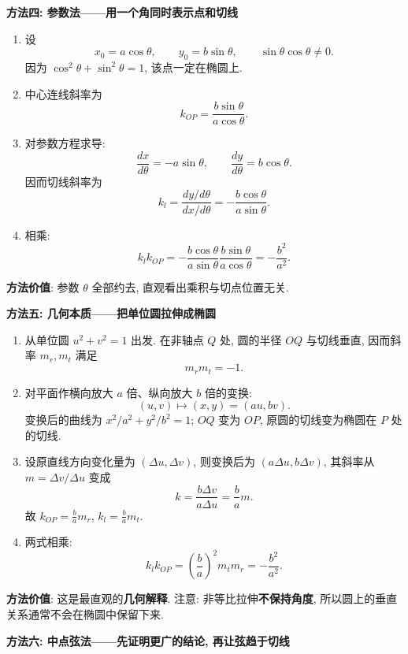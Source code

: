 \begin{proofbox}
\textbf{方法四: 参数法——用一个角同时表示点和切线}

\begin{enumerate}
  \item 设
  \[
  x_0=a\cos\theta,\qquad y_0=b\sin\theta,
  \qquad \sin\theta\cos\theta\ne0.
  \]
  因为 $\cos^2\theta+\sin^2\theta=1$, 该点一定在椭圆上.
  \item 中心连线斜率为
  \[
  k_{OP}=\frac{b\sin\theta}{a\cos\theta}.
  \]
  \item 对参数方程求导:
  \[
  \frac{dx}{d\theta}=-a\sin\theta,\qquad
  \frac{dy}{d\theta}=b\cos\theta.
  \]
  因而切线斜率为
  \[
  k_l=\frac{dy/d\theta}{dx/d\theta}
  =-\frac{b\cos\theta}{a\sin\theta}.
  \]
  \item 相乘:
  \[
  k_lk_{OP}=-\frac{b\cos\theta}{a\sin\theta}
   \frac{b\sin\theta}{a\cos\theta}
   =\boxed{-\frac{b^2}{a^2}}.
  \]
\end{enumerate}
\textbf{方法价值}: 参数 $\theta$ 全部约去, 直观看出乘积与切点位置无关.

\textbf{方法五: 几何本质——把单位圆拉伸成椭圆}

\begin{enumerate}
  \item 从单位圆 $u^2+v^2=1$ 出发. 在非轴点 $Q$ 处,
  圆的半径 $OQ$ 与切线垂直, 因而斜率 $m_r,m_t$ 满足
  \[
  m_rm_t=-1.
  \]
  \item 对平面作横向放大 $a$ 倍、纵向放大 $b$ 倍的变换:
  \[
  (u,v)\longmapsto(x,y)=(au,bv).
  \]
  变换后的曲线为 $x^2/a^2+y^2/b^2=1$;
  $OQ$ 变为 $OP$, 原圆的切线变为椭圆在 $P$ 处的切线.
  \item 设原直线方向变化量为 $(\Delta u,\Delta v)$,
  则变换后为 $(a\Delta u,b\Delta v)$, 其斜率从
  $m=\Delta v/\Delta u$ 变成
  \[
  k=\frac{b\Delta v}{a\Delta u}=\frac ba m.
  \]
  故 $k_{OP}=\frac ba m_r$, $k_l=\frac ba m_t$.
  \item 两式相乘:
  \[
  \boxed{k_lk_{OP}=\left(\frac ba\right)^2m_tm_r
  =-\frac{b^2}{a^2}.}
  \]
\end{enumerate}
\textbf{方法价值}: 这是最直观的\textbf{几何解释}.
注意: 非等比拉伸\textbf{不保持角度}, 所以圆上的垂直关系通常不会在椭圆中保留下来.

\textbf{方法六: 中点弦法——先证明更广的结论, 再让弦趋于切线}


\end{proofbox}
